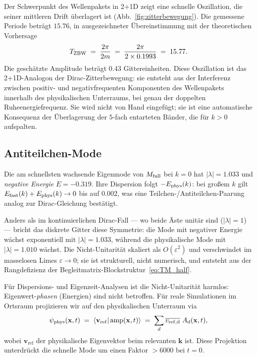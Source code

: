 \documentclass[twocolumn,showpacs,preprintnumbers,amsmath,amssymb]{revtex4-2}
\newcommand{\eps}{\varepsilon}
\newcommand{\vref}{\mathbf{v}_{\mathrm{ref}}}
\begin{document}
Der Schwerpunkt des Wellenpakets in 2+1D zeigt eine schnelle Oszillation,
die seiner mittleren Drift überlagert ist (Abb.~\ref{fig:zitterbewegung}).
Die gemessene Periode beträgt $15.76$, in ausgezeichneter Übereinstimmung
mit der theoretischen Vorhersage
\begin{equation}
  T_{\rm ZBW} \;=\; \frac{2\pi}{2m}
               \;=\; \frac{2\pi}{2 \times 0.1993}
               \;=\; 15.77.
  \label{eq:zbw_period}
\end{equation}
Die geschätzte Amplitude beträgt $0.43$ Gittereinheiten.
Diese Oszillation ist das 2+1D-Analogon der Dirac-Zitterbewegung: sie entsteht
aus der Interferenz zwischen positiv- und negativfrequenten Komponenten des
Wellenpakets innerhalb des physikalischen Unterraums, bei genau der doppelten
Ruheenergiefrequenz.
Sie wird nicht von Hand eingefügt; sie ist eine automatische Konsequenz der
Überlagerung der $5$-fach entarteten Bänder, die für $k > 0$ aufspalten.

\subsection{Antiteilchen-Mode}

Die am schnellsten wachsende Eigenmode von $M_{\rm full}$ bei $k = 0$ hat
$|\lambda| = 1.033$ und \emph{negative Energie} $E = -0.319$.
Ihre Dispersion folgt $-E_{\rm phys}(k)$: bei großem $k$ gilt
$E_{\rm fast}(k) + E_{\rm phys}(k) \to 0$ bis auf $0.002$,
was eine Teilchen-/Antiteilchen-Paarung analog zur Dirac-Gleichung bestätigt.

Anders als im kontinuierlichen Dirac-Fall --- wo beide Äste unitär sind
($|\lambda| = 1$) --- bricht das diskrete Gitter diese Symmetrie:
die Mode mit negativer Energie wächst exponentiell mit $|\lambda| = 1.033$,
während die physikalische Mode mit $|\lambda| = 1.010$ wächst.
Die Nicht-Unitarität skaliert als $O(\eps^2)$ und verschwindet im masselosen
Limes $\eps \to 0$; sie ist strukturell, nicht numerisch, und entsteht aus der
Rangdefizienz der Begleitmatrix-Blockstruktur~\eqref{eq:TM_half}.

Für Dispersions- und Eigenzeit-Analysen ist die Nicht-Unitarität harmlos:
Eigenwert-\emph{phasen} (Energien) sind nicht betroffen.
Für reale Simulationen im Ortsraum projizieren wir auf den physikalischen
Unterraum via
\begin{equation}
  \psi_{\rm phys}(\mathbf{x}, t)
  \;=\; \langle \vref | \,\mathrm{amp}(\mathbf{x}, t)\rangle
  \;=\; \sum_d \overline{v_{\rm ref,d}}\; A_d(\mathbf{x}, t),
  \label{eq:projection}
\end{equation}
wobei $\vref$ der physikalische Eigenvektor beim relevanten $\mathbf{k}$ ist.
Diese Projektion unterdrückt die schnelle Mode um einen Faktor $> 6000$ bei
$t = 0$.
\end{document}
